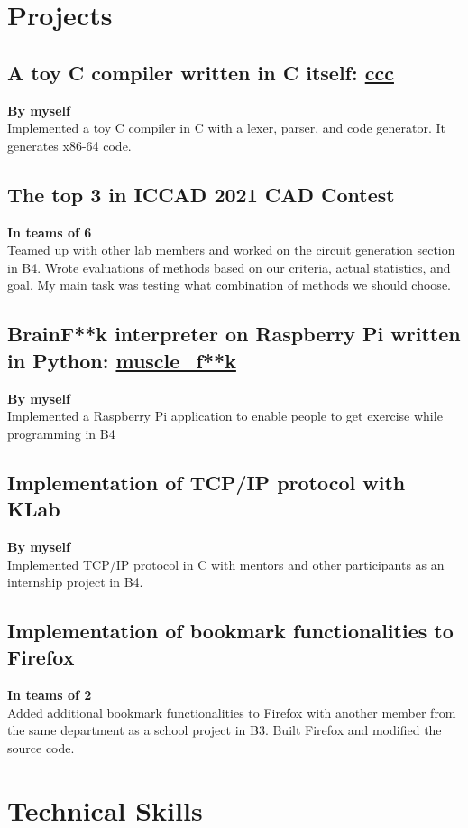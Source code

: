 \documentclass[10pt]{article}
\begin{document}
\section*{Projects}
  \subsection*{A toy C compiler written in C itself: \href{https://github.com/diohabara/ccc}{ccc}}
    \textbf{By myself}
    \\
    Implemented a toy C compiler in C with a lexer, parser, and code generator.
    It generates x86-64 code.
  \subsection*{The top 3 in ICCAD 2021 CAD Contest}
    \textbf{In teams of 6}
    \\
    Teamed up with other lab members and worked on the circuit generation section in B4.
    Wrote evaluations of methods based on our criteria, actual statistics, and goal.
    My main task was testing what combination of methods we should choose.
  \subsection*{BrainF**k interpreter on Raspberry Pi written in Python: \href{https://github.com/diohabara/muscle_fuck}{muscle\_f**k}}
    \textbf{By myself}
    \\
    Implemented a Raspberry Pi application to enable people to get exercise while programming in B4
  \subsection*{Implementation of TCP/IP protocol with KLab}
    \textbf{By myself}
    \\
    Implemented TCP/IP protocol in C with mentors and other participants as an internship project in B4.
  \subsection*{Implementation of bookmark functionalities to Firefox}
    \textbf{In teams of 2}
    \\
    Added additional bookmark functionalities to Firefox with another member from the same department as a school project in B3.
    Built Firefox and modified the source code.

\section*{Technical Skills}
\end{document}
